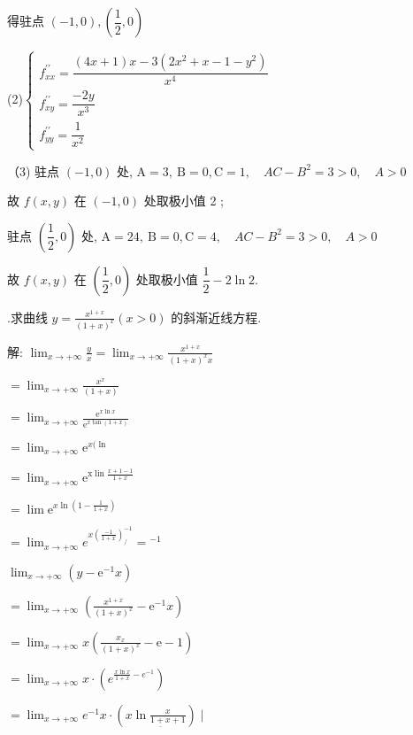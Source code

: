 \documentclass{article}
\begin{document}
得驻点 $(-1,0),\left(\dfrac{1}{2}, 0\right)$

(2)$\left\{\begin{array}{l}
        f_{x x}^{\prime \prime}=\dfrac{(4 x+1) x-3\left(2 x^{2}+x-1-y^{2}\right)}{x^{4}} \\
        f_{x y}^{\prime \prime}=\dfrac{-2 y}{x^{3}}                                      \\
        f_{y y}^{\prime \prime}=\dfrac{1}{x^{2}}
    \end{array}\right.$

（3) 驻点 $(-1,0)$ 处, $\mathrm{A}=3, \mathrm{~B}=0, \mathrm{C}=1, \quad A C-B^{2}=3>0, \quad A>0$

故 $f(x, y)$ 在 $(-1,0)$ 处取极小值 2 ;

驻点 $\left(\dfrac{1}{2}, 0\right)$ 处, $\mathrm{A}=24, \mathrm{~B}=0, \mathrm{C}=4, \quad A C-B^{2}=3>0, \quad A>0$

故 $f(x, y)$ 在 $\left(\dfrac{1}{2}, 0\right)$ 处取极小值 $\dfrac{1}{2}-2 \ln 2 .$

\vspace{1ex}
{.}求曲线 $y=\frac{x^{1+x}}{(1+x)^{x}}(x>0)$ 的斜渐近线方程.

解: $\lim _{x \rightarrow+\infty} \frac{y}{x}=\lim _{x \rightarrow+\infty} \frac{x^{1+x}}{(1+x)^{x} x}$

$=\lim _{x \rightarrow+\infty} \frac{x^{x}}{(1+x)}$

$=\lim _{x \rightarrow+\infty} \frac{\mathrm{e}^{x \ln x}}{\mathrm{e}^{x \tan (1+x)}}$

$=\lim _{x \rightarrow+\infty} \mathrm{e}^{x(\ln }$

$=\lim _{x \rightarrow+\infty} \mathrm{e}^{\mathrm{x} \operatorname{lin} \frac{x+1-1}{1+x}}$

$=\lim \mathrm{e}^{x \ln \left(1-\frac{1}{1+x}\right)}$

$=\lim _{x \rightarrow+\infty} e^{x\left(\frac{-1}{1+x}\right)_{/}^{-1}}={ }^{-1}$

$\lim _{x \rightarrow+\infty}\left(y-\mathrm{e}^{-1} x\right)$

$=\lim _{x \rightarrow+\infty}\left(\frac{x^{1+x}}{(1+x)^{x}}-\mathrm{e}^{-1} x\right)$

$=\lim _{x \rightarrow+\infty} x\left(\frac{x_{x}}{(1+x)^{x}}-\mathrm{e}-1\right)$

$=\lim _{x \rightarrow+\infty} x \cdot\left(e^{\frac{x \ln x}{1+x}-e^{-1}}\right)$

$=\lim _{x \rightarrow+\infty} e^{-1} x \cdot\left(x \ln \frac{x}{\underline{1+x}+1}\right) \mid$
\end{document}

